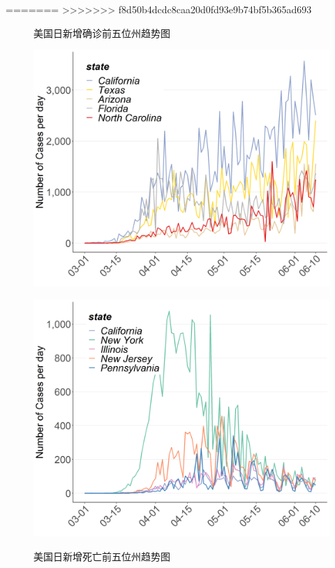 \documentclass[
]{article}
\begin{document}
=======
>>>>>>> f8d50b4dcdc8caa20d0fd93e9b74bf5b365ad693
\begin{figure}[H]
\centering
\begin{minipage}[b]{0.45\linewidth}
\caption{美国日新增确诊前五位州趋势图}
\includegraphics[]{./input/covid5.png}
\label{}
\end{minipage}
\quad
\begin{minipage}[b]{0.45\linewidth}
\caption{美国日新增死亡前五位州趋势图}
\includegraphics[]{./input/covid6.png}
\label{}
\end{minipage}
\end{figure}
\end{document}
